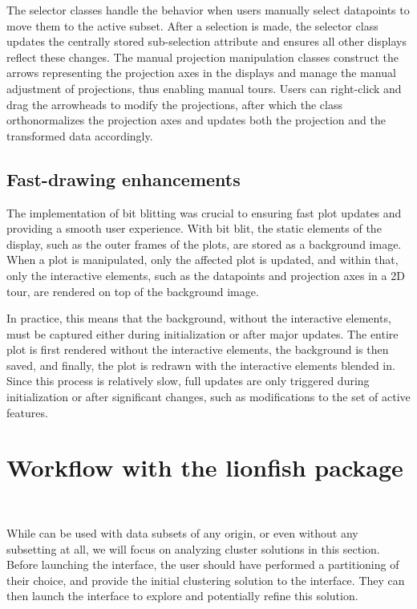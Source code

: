 \documentclass[article]{ajs}
\begin{document}
The selector classes handle the behavior when users manually select datapoints to move them to the active subset. After a selection is made, the selector class updates the centrally stored sub-selection attribute and ensures all other displays reflect these changes. The manual projection manipulation classes construct the arrows representing the projection axes in the displays and manage the manual adjustment of projections, thus enabling manual tours. Users can right-click and drag the arrowheads to modify the projections, after which the class orthonormalizes the projection axes and updates both the projection and the transformed data accordingly.

\subsection{Fast-drawing enhancements} \label{bit_blit}

The implementation of bit blitting was crucial to ensuring fast plot updates and providing a smooth user experience. With bit blit, the static elements of the display, such as the outer frames of the plots, are stored as a background image. When a plot is manipulated, only the affected plot is updated, and within that, only the interactive elements, such as the datapoints and projection axes in a 2D tour, are rendered on top of the background image.

In practice, this means that the background, without the interactive elements, must be captured either during initialization or after major updates. The entire plot is first rendered without the interactive elements, the background is then saved, and finally, the plot is redrawn with the interactive elements blended in. Since this process is relatively slow, full updates are only triggered during initialization or after significant changes, such as modifications to the set of active features.

\section{Workflow with the lionfish package}~\label{workflow}

While  can be used with data subsets of any origin, or even without any subsetting at all, we will focus on analyzing cluster solutions in this section. Before launching the  interface, the user should have performed a partitioning of their choice, and provide the initial clustering solution to the interface. They can then launch the interface to explore and potentially refine this solution.
\end{document}
